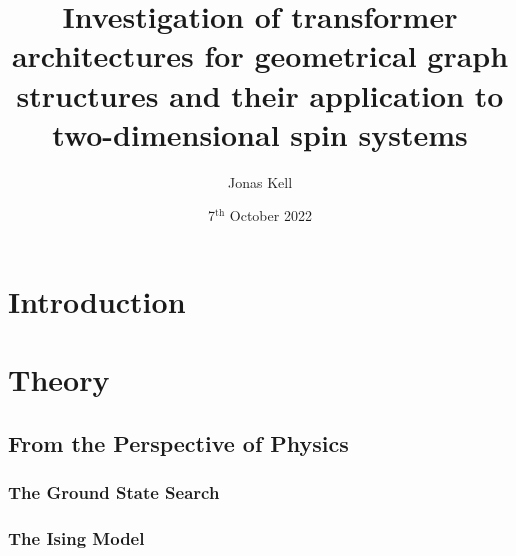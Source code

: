 \documentclass[
headings=optiontohead,              %
12pt,                               %
DIV=13,                             %
twoside=false,                      %
open=right,                         %
BCOR=10mm,                          %
toc=bibliographynumbered            %
]{scrreport}
\title{Investigation of transformer architectures for geometrical graph structures and their application to two-dimensional spin systems}
\author{Jonas Kell}
\date{7$^\text{th}$ October 2022}
\begin{document}
\thispagestyle{empty}                           %
\cleardoublepage                                %
\pagestyle{scrheadings}                         %
\renewcommand{\contentsname}{Table of Contents} %
\tableofcontents                                %
\cleardoublepage                                %

\clearpairofpagestyles
\ihead{\leftmark}
\ohead{\Ifstr{\leftmark}{\rightmark}{}{\rightmark}}
\cfoot*{\pagemark}


\chapter{Introduction}
\label{sec:introduction}

\FloatBarrier
\chapter{Theory}
\label{sec:theory}
    \section{From the Perspective of Physics}
        \label{sec:theory-physics}
        
        \FloatBarrier
        \subsection{The Ground State Search}
        \label{sec:theory-groundstatesearch}
        
        \subsection{The Ising Model}
        \label{sec:theory-ising}
        
        \FloatBarrier
\end{document}
